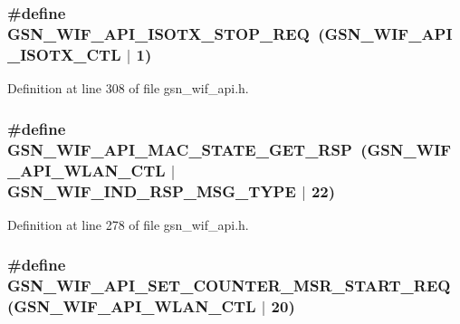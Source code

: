 \hypertarget{a00606_a4fc41bc8b4a53ac4f838a63d82a440cb}{
\subsubsection[{GSN\_\-WIF\_\-API\_\-ISOTX\_\-STOP\_\-REQ}]{\setlength{\rightskip}{0pt plus 5cm}\#define GSN\_\-WIF\_\-API\_\-ISOTX\_\-STOP\_\-REQ~(GSN\_\-WIF\_\-API\_\-ISOTX\_\-CTL $|$ 1)}}
\label{a00606_a4fc41bc8b4a53ac4f838a63d82a440cb}


Definition at line 308 of file gsn\_\-wif\_\-api.h.

\hypertarget{a00606_a1b36f022c11587b107a5c881b7f4a1bc}{
\subsubsection[{GSN\_\-WIF\_\-API\_\-MAC\_\-STATE\_\-GET\_\-RSP}]{\setlength{\rightskip}{0pt plus 5cm}\#define GSN\_\-WIF\_\-API\_\-MAC\_\-STATE\_\-GET\_\-RSP~(GSN\_\-WIF\_\-API\_\-WLAN\_\-CTL $|$ GSN\_\-WIF\_\-IND\_\-RSP\_\-MSG\_\-TYPE $|$ 22)}}
\label{a00606_a1b36f022c11587b107a5c881b7f4a1bc}


Definition at line 278 of file gsn\_\-wif\_\-api.h.

\hypertarget{a00606_a79cd91d26d1dfdd3b3e00f8568587797}{
\subsubsection[{GSN\_\-WIF\_\-API\_\-SET\_\-COUNTER\_\-MSR\_\-START\_\-REQ}]{\setlength{\rightskip}{0pt plus 5cm}\#define GSN\_\-WIF\_\-API\_\-SET\_\-COUNTER\_\-MSR\_\-START\_\-REQ~(GSN\_\-WIF\_\-API\_\-WLAN\_\-CTL $|$ 20)}}
\label{a00606_a79cd91d26d1dfdd3b3e00f8568587797}


